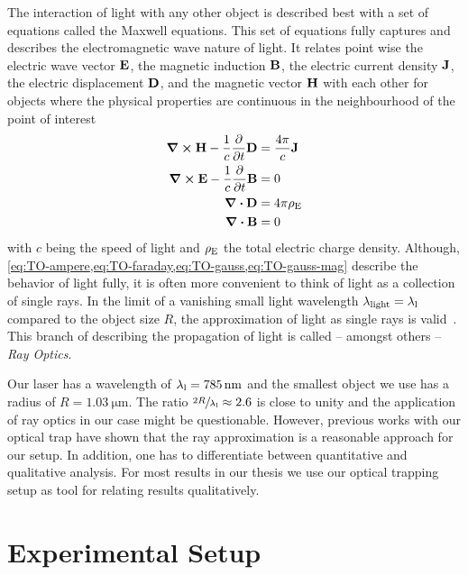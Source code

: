 The interaction of light with any other object is described best with a set of 
equations called the Maxwell equations. This set of equations fully captures 
and describes the electromagnetic wave nature of light. It relates point wise 
the electric wave vector $\vb{E}$, the magnetic induction $\vb{B}$, the 
electric current density $\vb{J}$, the electric displacement $\vb{D}$, and the 
magnetic vector $\vb{H}$ with each other for objects where the physical 
properties are continuous in the neighbourhood of the point of 
interest~\cite{Born1980Ch1}
\begin{subequations}
  \begin{align}
    \curl{\vb{H}} - \frac{1}{c}\pdv{t}\vb{D} &=\frac{4\pi}{c}\vb{J} 
    \label{eq:TO-ampere} \\
    \curl{\vb{E}} - \frac{1}{c}\pdv{t}\vb{B} &=  0
    \label{eq:TO-faraday} \\
    \div{\vb{D}} &= 4\pi\rho_{\mathrm{E}}
    \label{eq:TO-gauss} \\
    \div{\vb{B}} &= 0
    \label{eq:TO-gauss-mag}
  \end{align}
\end{subequations}
with $c$ being the speed of light and $\rho_{\mathrm{E}}$ the total electric charge 
density. Although, 
\cref{eq:TO-ampere,eq:TO-faraday,eq:TO-gauss,eq:TO-gauss-mag} describe the 
behavior of light fully, it is often more convenient to think of light as a 
collection of single rays. In the limit of a vanishing small light wavelength 
$\lambda_{\text{light}}=\lambda_{\mathrm{l}}$ compared to the object size $R$, the 
approximation of light as single rays is valid~\cite{Born1980Ch3}. This branch 
of describing the propagation of light is called -- amongst others -- \emph{Ray 
Optics}.

Our laser has a wavelength of $\lal=\SI{785}{\nm}$ and the smallest object we 
use has a radius of $R=\SI{1.03}{\um}$. The ratio $\sfrac{2R}{\lambda_{\mathrm{l}}}\approx 2.6$ 
is close to unity and the application of ray optics in our case might be 
questionable. However, previous works with our optical trap
\cite{Lakaemper2015,Lamprecht2016,Lamprecht2017} have shown that the ray 
approximation is a reasonable approach for our setup. In addition, one has to 
differentiate between quantitative and qualitative analysis. For most results 
in our thesis we use our optical trapping setup as tool for relating results 
qualitatively.

\section{Experimental Setup}

